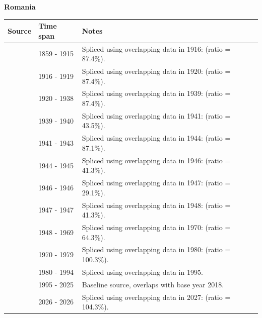 \documentclass[12pt,a4paper,landscape]{article}
\begin{document}
\begin{adjustbox}{max totalsize={\paperwidth}{\paperheight},center}
\begin{minipage}[t][\textheight][t]{\textwidth}
\vspace*{0.5cm}
{}
\begin{center}
{\Large\bfseries Romania}
\end{center}
\vspace{0.5cm}
\begin{table}[H]
\centering
\small
\begin{tabular}{|l|l|l|}
\hline
\textbf{Source} & \textbf{Time span} & \textbf{Notes} \\
\hline
\rowcolor{white}\cite{Tena}& 1859 - 1915 &Spliced using overlapping data in 1916: (ratio = 87.4\%).\\
\rowcolor{lightgray}\cite{Mitchell}& 1916 - 1919 &Spliced using overlapping data in 1920: (ratio = 87.4\%).\\
\rowcolor{white}\cite{Tena}& 1920 - 1938 &Spliced using overlapping data in 1939: (ratio = 87.4\%).\\
\rowcolor{lightgray}\cite{NBS}& 1939 - 1940 &Spliced using overlapping data in 1941: (ratio = 43.5\%).\\
\rowcolor{white}\cite{Mitchell}& 1941 - 1943 &Spliced using overlapping data in 1944: (ratio = 87.1\%).\\
\rowcolor{lightgray}\cite{NBS}& 1944 - 1945 &Spliced using overlapping data in 1946: (ratio = 41.3\%).\\
\rowcolor{white}\cite{Mitchell}& 1946 - 1946 &Spliced using overlapping data in 1947: (ratio = 29.1\%).\\
\rowcolor{lightgray}\cite{NBS}& 1947 - 1947 &Spliced using overlapping data in 1948: (ratio = 41.3\%).\\
\rowcolor{white}\cite{Mitchell}& 1948 - 1969 &Spliced using overlapping data in 1970: (ratio = 64.3\%).\\
\rowcolor{lightgray}\cite{UN}& 1970 - 1979 &Spliced using overlapping data in 1980: (ratio = 100.3\%).\\
\rowcolor{white}\cite{AMECO}& 1980 - 1994 &Spliced using overlapping data in 1995.\\
\rowcolor{lightgray}\cite{OECD_EO}& 1995 - 2025 &Baseline source, overlaps with base year 2018.\\
\rowcolor{white}\cite{AMECO}& 2026 - 2026 &Spliced using overlapping data in 2027: (ratio = 104.3\%).\\

\end{tabular}
\end{table}
\end{minipage}
\end{adjustbox}
\end{document}
